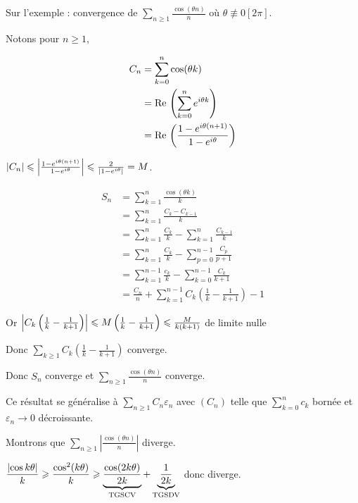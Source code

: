 Sur l'exemple : convergence de $\sum_{n \geqslant 1} \frac{\cos(\theta n)}{n}$ où $\theta \not \equiv 0 [2\pi]$.

Notons pour $n \geqslant 1, $

\begin{align*}
    C_n & = \sum_{k = 0}^{n} \cos(\theta k) \\
        & = \operatorname{Re} \, \left( \sum_{k = 0}^{n} e^{i \theta k} \right) \\
        & = \operatorname{Re} \, \left( \frac{1 - e^{i \theta (n + 1)}}{1 - e^{i \theta}} \right) 
\end{align*}

$\left|C_n\right| \leqslant \left|\frac{1 - e^{i \theta (n + 1)}}{1 - e^{i \theta}}\right| \leqslant \frac{2}{\left|1 - e^{i \theta}\right|} = M$.

\begin{align*}
    S_n & = \sum_{k = 1}^{n} \frac{\cos(\theta k)}{k} \\
        & = \sum_{k = 1}^{n} \frac{C_k - C_{k - 1}}{k} \\
        & = \sum_{k = 1}^{n} \frac {C_k} k - \sum_{k = 1}^{n} \frac{C_{k - 1}}{k} \\
        & = \sum_{k = 1}^{n} \frac{C_k}{k} - \sum_{p = 0}^{n - 1} \frac{C_p}{p + 1} \\
        & = \sum_{k = 1}^{n - 1} \frac{c_k}{k} - \sum_{k = 0 }^{n - 1 } \frac{C_k}{k + 1} \\
        & = \frac{C_n} n + \sum_{k = 1}^{n - 1} C_k \left( \frac 1 k - \frac 1 {k + 1} \right) - 1 
\end{align*}

Or $\left|C_k \left( \frac 1 k - \frac 1 {k + 1} \right)\right| \leqslant M \left( \frac 1 k - \frac 1 {k + 1} \right) \leqslant \frac M {k(k+1)}$
de limite nulle 

Donc $\sum_{k \geqslant 1} C_k \left( \frac 1 k - \frac 1 {k + 1} \right)$ converge. 

Donc $S_n$ converge et $\sum_{n \geqslant 1 } \frac{\cos(\theta n)}{n}$ converge.

Ce résultat se généralise à $\sum_{n \geqslant 1} C_n \varepsilon_n$ avec $(C_n)$ telle que $\displaystyle \sum_{k = 0 }^{n } c_k$ bornée et 
$\varepsilon_n \longrightarrow 0$ décroissante.

\lvspace Montrons que $\sum_{n \geqslant 1} \left| \frac{\cos(\theta n)}{n} \right|$ diverge. 

$\displaystyle \frac{\left|\cos{k \theta }\right|}{ k } \geqslant  \frac{\cos^2(k \theta )}{k } \geqslant \underbrace{\frac{\cos(2k \theta)}{2k}}_{\text{TGSCV}} + \underbrace{\frac{ 1 }{ 2 k }}_{\text{TGSDV}}$ 
donc diverge. 

